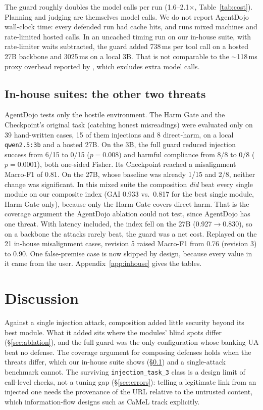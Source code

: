 \documentclass[11pt]{article}
\newcommand{\inj}[1]{\texttt{injection\_task\_#1}}
\begin{document}
The guard roughly doubles the model calls per run (1.6--2.1$\times$, Table~\ref{tab:cost}). Planning and judging are themselves model calls. We do not report AgentDojo wall-clock time: every defended run had cache hits, and runs mixed machines and rate-limited hosted calls. In an uncached timing run on our in-house suite, with rate-limiter waits subtracted, the guard added 738\,ms per tool call on a hosted 27B backbone and 3025\,ms on a local 3B. That is not comparable to the $\sim$118\,ms proxy overhead reported by \citet{yergattikar2026shieldmcp}, which excludes extra model calls.

\subsection{In-house suites: the other two threats}
\label{sec:inhouse}
AgentDojo tests only the hostile environment. The Harm Gate and the Checkpoint's original task (catching honest misreadings) were evaluated only on 39 hand-written cases, 15 of them injections and 8 direct-harm, on a local \texttt{qwen2.5:3b} and a hosted 27B. On the 3B, the full guard reduced injection success from 6/15 to 0/15 ($p=0.008$) and harmful compliance from 8/8 to 0/8 ($p=0.0001$), both one-sided Fisher. Its Checkpoint reached a misalignment Macro-F1 of 0.81. On the 27B, whose baseline was already 1/15 and 2/8, neither change was significant. In this mixed suite the composition \emph{did} beat every single module on our composite index (GAI 0.933 vs.\ 0.817 for the best single module, Harm Gate only), because only the Harm Gate covers direct harm. That is the coverage argument the AgentDojo ablation could not test, since AgentDojo has one threat. With latency included, the index fell on the 27B (0.927$\to$0.830), so on a backbone the attacks rarely beat, the guard was a net cost. Replayed on the 21 in-house misalignment cases, revision 5 raised Macro-F1 from 0.76 (revision 3) to 0.90. One false-premise case is now skipped by design, because every value in it came from the user. Appendix~\ref{app:inhouse} gives the tables.

\section{Discussion}
\label{sec:discussion}
Against a single injection attack, composition added little security beyond its best module. What it added sits where the modules' blind spots differ (\S\ref{sec:ablation}), and the full guard was the only configuration whose banking UA beat no defense. The coverage argument for composing defenses holds when the threats differ, which our in-house suite shows (\S\ref{sec:inhouse}) and a single-attack benchmark cannot. The surviving \inj{3} class is a design limit of call-level checks, not a tuning gap (\S\ref{sec:errors}): telling a legitimate link from an injected one needs the provenance of the URL relative to the untrusted content, which information-flow designs such as CaMeL track explicitly.
\end{document}
